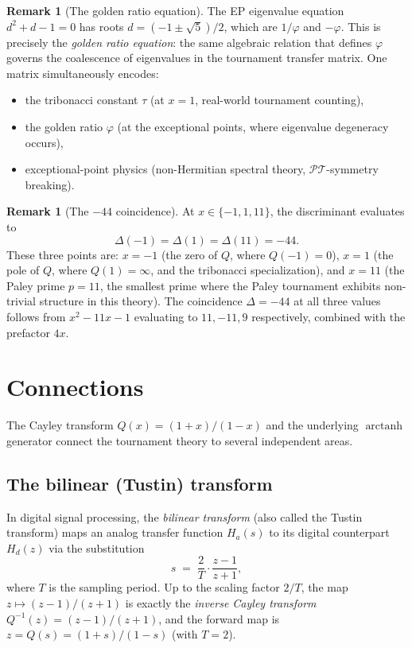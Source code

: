 \documentclass[11pt]{amsart}
\theoremstyle{definition}
\newtheorem{remark}[theorem]{Remark}
\DeclareMathOperator{\arctanh}{arctanh}
\begin{document}
\begin{remark}[The golden ratio equation]\label{rem:golden}
The EP eigenvalue equation $d^2 + d - 1 = 0$ has roots $d = (-1 \pm \sqrt{5})/2$, which are $1/\varphi$ and $-\varphi$. This is precisely the \emph{golden ratio equation}: the same algebraic relation that defines $\varphi$ governs the coalescence of eigenvalues in the tournament transfer matrix. One matrix simultaneously encodes:
\begin{itemize}
\item the tribonacci constant $\tau$ (at $x = 1$, real-world tournament counting),
\item the golden ratio $\varphi$ (at the exceptional points, where eigenvalue degeneracy occurs),
\item exceptional-point physics (non-Hermitian spectral theory, $\mathcal{PT}$-symmetry breaking).
\end{itemize}
\end{remark}

\begin{remark}[The $-44$ coincidence]\label{rem:minus44}
At $x \in \{-1, 1, 11\}$, the discriminant evaluates to
\[
\Delta(-1) = \Delta(1) = \Delta(11) = -44.
\]
These three points are: $x = -1$ (the zero of $Q$, where $Q(-1) = 0$), $x = 1$ (the pole of $Q$, where $Q(1) = \infty$, and the tribonacci specialization), and $x = 11$ (the Paley prime $p = 11$, the smallest prime where the Paley tournament exhibits non-trivial structure in this theory). The coincidence $\Delta = -44$ at all three values follows from $x^2 - 11x - 1$ evaluating to $11, -11, 9$ respectively, combined with the prefactor $4x$.
\end{remark}

\section{Connections}

The Cayley transform $Q(x) = (1+x)/(1-x)$ and the underlying $\arctanh$ generator connect the tournament theory to several independent areas.

\subsection{The bilinear (Tustin) transform}

In digital signal processing, the \emph{bilinear transform} (also called the Tustin transform) maps an analog transfer function $H_a(s)$ to its digital counterpart $H_d(z)$ via the substitution
\[
s \;=\; \frac{2}{T}\cdot\frac{z - 1}{z + 1},
\]
where $T$ is the sampling period. Up to the scaling factor $2/T$, the map $z \mapsto (z-1)/(z+1)$ is exactly the \emph{inverse Cayley transform} $Q^{-1}(z) = (z-1)/(z+1)$, and the forward map is $z = Q(s) = (1+s)/(1-s)$ (with $T = 2$).
\end{document}
